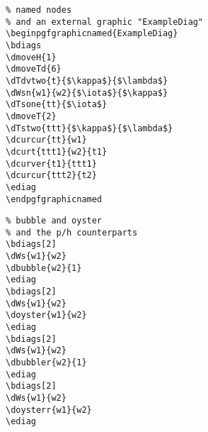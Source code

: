 \documentclass[a4paper]{article}
\begin{document}
\begin{minipage}[b]{0.55\linewidth}\centering
 \begin{lstlisting}
% named nodes 
% and an external graphic "ExampleDiag"
\beginpgfgraphicnamed{ExampleDiag}
\bdiags
\dmoveH{1}
\dmoveTd{6}
\dTdvtwo{t}{$\kappa$}{$\lambda$}
\dWsn{w1}{w2}{$\iota$}{$\kappa$}
\dTsone{tt}{$\iota$}
\dmoveT{2}
\dTstwo{ttt}{$\kappa$}{$\lambda$}
\dcurcur{tt}{w1}
\dcurt{ttt1}{w2}{t1}
\dcurver{t1}{ttt1}
\dcurcur{ttt2}{t2}
\ediag
\endpgfgraphicnamed
\end{lstlisting}
\end{minipage}
 \begin{minipage}[b]{0.45\linewidth}\centering
\bdiags
{}
\ediag
\endpgfgraphicnamed
\end{minipage}


\begin{minipage}[b]{0.55\linewidth}\centering
 \begin{lstlisting}
% bubble and oyster
% and the p/h counterparts 
\bdiags[2]
\dWs{w1}{w2}
\dbubble{w2}{1}
\ediag
\bdiags[2]
\dWs{w1}{w2}
\doyster{w1}{w2}
\ediag
\bdiags[2]
\dWs{w1}{w2}
\dbubbler{w2}{1}
\ediag
\bdiags[2]
\dWs{w1}{w2}
\doysterr{w1}{w2}
\ediag
\end{lstlisting}
\end{minipage}
 \begin{minipage}[b]{0.45\linewidth}\centering
\bdiags[2]
\ediag
\bdiags[2]
\ediag
\bdiags[2]
\ediag
\bdiags[2]
\ediag
\end{minipage}
\end{document}
